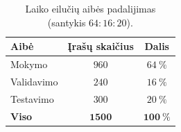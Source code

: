 \begin{table}[H]
    \centering
    \caption{Laiko eilučių aibės padalijimas (santykis $64{:}16{:}20$).}
    \begin{tabular}{|l|c|c|}
        \hline
        Aibė & Įrašų skaičius & Dalis \\
        \hline
        Mokymo & $960$ & $64\ \%$ \\ \hline
        Validavimo & $240$ & $16\ \%$ \\ \hline
        Testavimo & $300$ & $20\ \%$ \\ \hline
        \textbf{Viso} & $\mathbf{1500}$ & $\mathbf{100\ \%}$ \\ \hline
    \end{tabular}
    \label{tab:keystroke_split}
\end{table}
